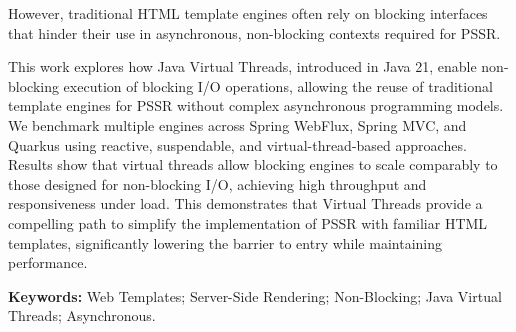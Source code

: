 \documentclass[a4paper,openright,twoside,11pt]{report}
\begin{document}
However, traditional HTML template engines often rely on blocking interfaces
that hinder their use in asynchronous, non-blocking contexts required for PSSR.

This work explores how Java Virtual Threads, introduced in Java 21, enable
non-blocking execution of blocking I/O operations, allowing the reuse of
traditional template engines for PSSR without complex asynchronous programming
models. We benchmark multiple engines across Spring WebFlux, Spring MVC, and
Quarkus using reactive, suspendable, and virtual-thread-based approaches.
Results show that virtual threads allow blocking engines to scale comparably to
those designed for non-blocking I/O, achieving high throughput and
responsiveness under load. This demonstrates that Virtual Threads provide a
compelling path to simplify the implementation of PSSR with familiar HTML
templates, significantly lowering the barrier to entry while maintaining
performance.

\vspace{5mm}

{\bf Keywords:} Web Templates; Server-Side Rendering; Non-Blocking; Java Virtual Threads; Asynchronous.


\cleardoublepage
\tableofcontents \cleardoublepage


\setcounter{page}{1}















\end{document}
